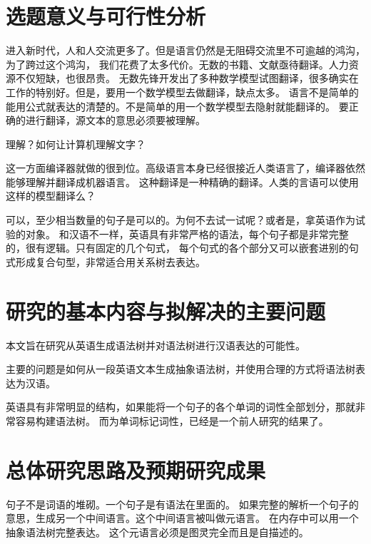 \documentclass[12pt,a4paper]{article}
\begin{document}
\begin{onehalfspace}

\section{选题意义与可行性分析}

进入新时代，人和人交流更多了。但是语言仍然是无阻碍交流里不可逾越的鸿沟，为了跨过这个鸿沟，
我们花费了太多代价。无数的书籍、文献亟待翻译。人力资源不仅短缺，也很昂贵。
无数先锋开发出了多种数学模型试图翻译，很多确实在工作的特别好。但是，要用一个数学模型去做翻译，缺点太多。
语言不是简单的能用公式就表达的清楚的。不是简单的用一个数学模型去隐射就能翻译的。
要正确的进行翻译，源文本的意思必须要被理解。

理解？如何让计算机理解文字？

这一方面编译器就做的很到位。高级语言本身已经很接近人类语言了，编译器依然能够理解并翻译成机器语言。
这种翻译是一种精确的翻译。人类的言语可以使用这样的模型翻译么？
 \cite{Compilers_Principles_Techniques_and_Tools}

可以，至少相当数量的句子是可以的。为何不去试一试呢？或者是，拿英语作为试验的对象。
和汉语不一样，英语具有非常严格的语法，每个句子都是非常完整的，很有逻辑。只有固定的几个句式，
每个句式的各个部分又可以嵌套进别的句式形成复合句型，非常适合用关系树去表达。

\section{研究的基本内容与拟解决的主要问题}

本文旨在研究从英语生成语法树并对语法树进行汉语表达的可能性。

主要的问题是如何从一段英语文本生成抽象语法树，并使用合理的方式将语法树表达为汉语。

英语具有非常明显的结构，如果能将一个句子的各个单词的词性全部划分，那就非常容易构建语法树。
而为单词标记词性，已经是一个前人研究的结果了。


\section{总体研究思路及预期研究成果}

句子不是词语的堆砌。一个句子是有语法在里面的。 
如果完整的解析一个句子的意思，生成另一个中间语言。这个中间语言被叫做元语言。 在内存中可以用一个抽象语法树完整表达。
这个元语言必须是图灵完全而且是自描述的。 


\end{onehalfspace}
\end{document}
